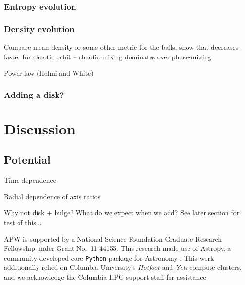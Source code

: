 \documentclass[letterpaper,12pt,preprint]{aastex}
\begin{document}
\subsubsection{Entropy evolution}

\subsubsection{Density evolution}

Compare mean density or some other metric for the balls, show that decreases faster for chaotic orbit -- chaotic mixing dominates over phase-mixing

Power law (Helmi and White)

\subsubsection{Adding a disk?}

\section{Discussion}\label{sec:discussion}

\subsection{Potential}

Time dependence

Radial dependence of axis ratios

Why not disk + bulge? What do we expect when we add? See later section for test of this...

\acknowledgements
APW is supported by a National Science Foundation Graduate Research Fellowship under Grant No.\ 11-44155. 
This research made use of Astropy, a community-developed core \texttt{Python} package for Astronomy \citep{astropy13}.
This work additionally relied on Columbia University's \emph{Hotfoot} and \emph{Yeti} compute clusters, and we acknowledge the Columbia HPC support staff for assistance. \\



\end{document}
